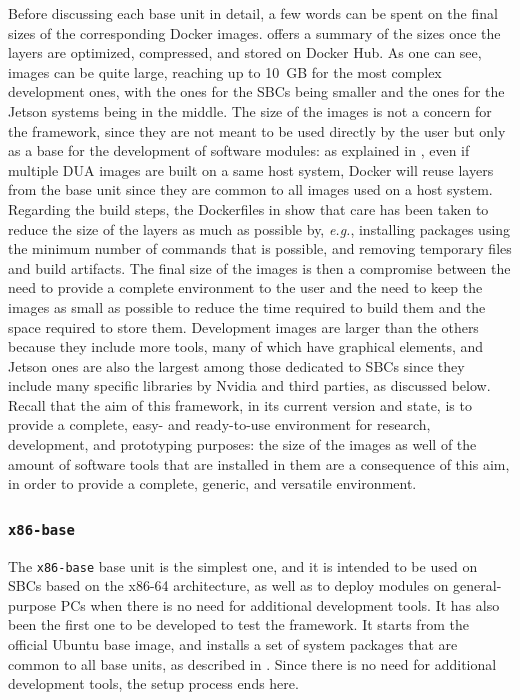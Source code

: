 Before discussing each base unit in detail, a few words can be spent on the final sizes of the corresponding Docker images.  offers a summary of the sizes once the layers are optimized, compressed, and stored on Docker Hub. As one can see, images can be quite large, reaching up to \SI{10}{GB} for the most complex development ones, with the ones for the SBCs being smaller and the ones for the Jetson systems being in the middle. The size of the images is not a concern for the framework, since they are not meant to be used directly by the user but only as a base for the development of software modules: as explained in , even if multiple DUA images are built on a same host system, Docker will reuse layers from the base unit since they are common to all images used on a host system. Regarding the build steps, the Dockerfiles in \cite{masocco_dua-foundation_nodate} show that care has been taken to reduce the size of the layers as much as possible by, \emph{e.g.}, installing packages using the minimum number of commands that is possible, and removing temporary files and build artifacts. The final size of the images is then a compromise between the need to provide a complete environment to the user and the need to keep the images as small as possible to reduce the time required to build them and the space required to store them. Development images are larger than the others because they include more tools, many of which have graphical elements, and Jetson ones are also the largest among those dedicated to SBCs since they include many specific libraries by Nvidia and third parties, as discussed below. Recall that the aim of this framework, in its current version and state, is to provide a complete, easy- and ready-to-use environment for research, development, and prototyping purposes: the size of the images as well of the amount of software tools that are installed in them are a consequence of this aim, in order to provide a complete, generic, and versatile environment.

\subsubsection{\texttt{x86-base}}
\label{sec:dua_base_units_x86-base}
The \texttt{x86-base} base unit is the simplest one, and it is intended to be used on SBCs based on the x86-64 architecture, as well as to deploy modules on general-purpose PCs when there is no need for additional development tools. It has also been the first one to be developed to test the framework. It starts from the official Ubuntu base image, and installs a set of system packages that are common to all base units, as described in . Since there is no need for additional development tools, the setup process ends here.

